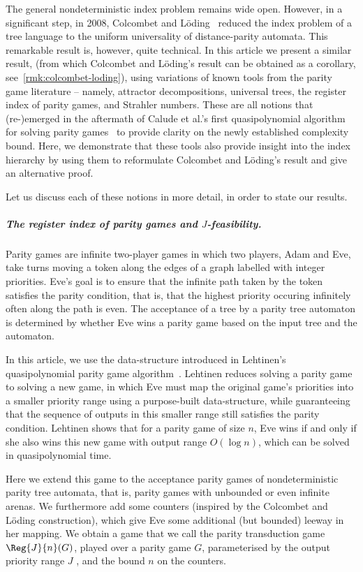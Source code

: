 \documentclass[a4paper,UKenglish,cleveref, autoref, thm-restate]{lipics-v2021}
\begin{document}
The general nondeterministic index problem remains wide open. However, in a significant step, in 2008, Colcombet and Löding~\cite{Guidable} reduced the index problem of a tree language to the uniform universality of distance-parity automata. 
This remarkable result is, however, quite technical. In this article we present a similar result, (from which Colcombet and Löding's result can be obtained as a corollary, see~\cref{rmk:colcombet-loding}), using variations of known tools from the parity game literature -- namely, attractor decompositions, universal trees, the register index of parity games, and Strahler numbers. These are all notions that (re-)emerged in the aftermath of Calude et al.'s first quasipolynomial algorithm for solving parity games~\cite{Calude2017DecidingPG} to provide clarity on the newly established complexity bound. Here, we demonstrate that these tools also provide insight into the index hierarchy by using them to reformulate Colcombet and Löding's result and give an alternative proof.

Let us discuss each of these notions in more detail, in order to state our results.\\




\subparagraph*{The register index of parity games and $J$-feasibility.} Parity games are infinite two-player games in which two players, Adam and Eve, take turns moving a token along the edges of a graph labelled with integer priorities. Eve's goal is to ensure that the infinite path taken by the token satisfies the parity condition, that is, that the highest priority occuring infinitely often along the path is even. The acceptance of a tree by a parity tree automaton is determined by whether Eve wins a parity game based on the input tree and the automaton. 

In this article, we use the data-structure introduced in Lehtinen's quasipolynomial parity game algorithm~\cite{RegisterGames}. Lehtinen reduces solving a parity game to solving a new game, in which Eve must map the original game's priorities into a smaller priority range using a purpose-built data-structure, while guaranteeing that the sequence of outputs in this smaller range still satisfies the parity condition. Lehtinen shows that for a parity game of size $n$, Eve wins if and only if she also wins this new game with output range $O(\log n)$, which can be solved in quasipolynomial time.

Here we extend this game to the acceptance parity games of nondeterministic parity tree automata, that is, parity games with  unbounded or even infinite arenas. We furthermore add some counters (inspired by the Colcombet and L\"oding construction), which give  Eve some additional (but bounded) leeway in her mapping. We obtain a game that we call the parity transduction game $\Reg{J}{n}(G)$, played over a parity game $G$, parameterised by the output priority range $J$ , and the bound $n$ on the counters.
\end{document}
